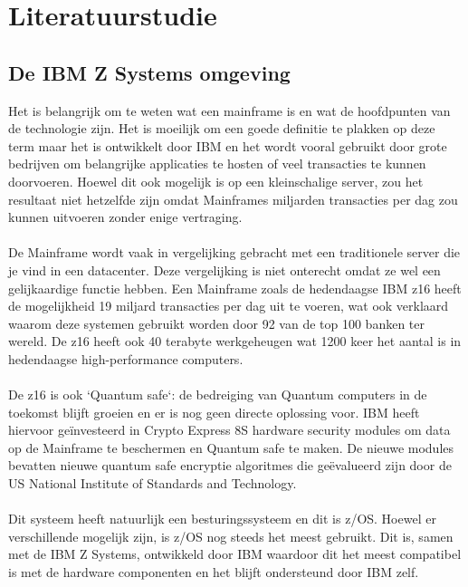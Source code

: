 
\chapter{Literatuurstudie}
\label{ch:literatuurstudie}

\section{De IBM Z Systems omgeving}
\label{sec:De IBM Z Systems omgeving}
Het is belangrijk om te weten wat een mainframe is en wat de hoofdpunten van de technologie zijn. Het is moeilijk om een goede definitie te plakken op deze term maar het is ontwikkelt door IBM en het wordt vooral gebruikt door grote bedrijven om belangrijke applicaties te hosten of veel transacties te kunnen doorvoeren. Hoewel dit ook mogelijk is op een kleinschalige server, zou het resultaat niet hetzelfde zijn omdat Mainframes miljarden transacties per dag zou kunnen uitvoeren zonder enige vertraging. \autocite{BasuMallick2023} \\ \\
De Mainframe wordt vaak in vergelijking gebracht met een traditionele server die je vind in een datacenter. Deze vergelijking is niet onterecht omdat ze wel een gelijkaardige functie hebben. Een Mainframe zoals de hedendaagse IBM z16 heeft de mogelijkheid 19 miljard transacties per dag uit te voeren, wat ook verklaard waarom deze systemen gebruikt worden door 92 van de top 100 banken ter wereld. De z16 heeft ook 40 terabyte werkgeheugen wat 1200 keer het aantal is in hedendaagse high-performance computers. \autocite{Tozzi2022} \\ \\
De z16 is ook `Quantum safe`: de bedreiging van Quantum computers in de toekomst blijft groeien en er is nog geen directe oplossing voor. IBM heeft hiervoor geïnvesteerd in Crypto Express 8S hardware security modules om data op de Mainframe te beschermen en Quantum safe te maken. De nieuwe modules bevatten nieuwe quantum safe encryptie algoritmes die geëvalueerd zijn door de US National Institute of Standards and Technology. \autocite{Sayer2022}
\\ \\
Dit systeem heeft natuurlijk een besturingssysteem en dit is z/OS. Hoewel er verschillende mogelijk zijn, is z/OS nog steeds het meest gebruikt. Dit is, samen met de IBM Z Systems, ontwikkeld door IBM waardoor dit het meest compatibel is met de hardware componenten en het blijft ondersteund door IBM zelf.

